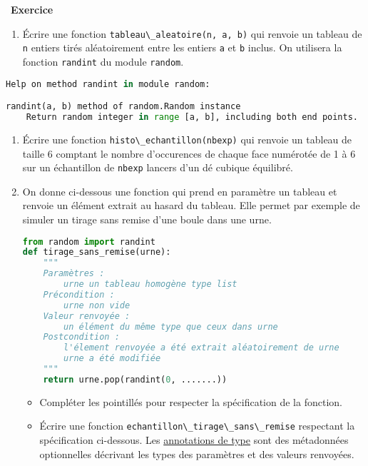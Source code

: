 \documentclass[
  10pt,
]{article}
\newcommand{\passthrough}[1]{#1}
\providecommand{\tightlist}{%
  \setlength{\itemsep}{0pt}\setlength{\parskip}{0pt}}
\newcounter{exo}
\newenvironment{exercice}[1]
{\par \medskip   \addtocounter{exo}{1} \noindent  
\begin{bclogo}[arrondi =0.1,   noborder = true, logo=\bccrayon, marge=4]{~\textbf{Exercice} \textbf{\theexo} {\itshape #1} }  \par}
{
\end{bclogo}
 \par \bigskip }
\newcounter{def}
\newcounter{histo}
\begin{document}
\begin{exercice}{}

\begin{enumerate}
\def\labelenumi{\arabic{enumi}.}
\tightlist
\item
  Écrire une fonction
  \passthrough{\lstinline!tableau\_aleatoire(n, a, b)!} qui renvoie un
  tableau de \passthrough{\lstinline!n!} entiers tirés aléatoirement
  entre les entiers \passthrough{\lstinline!a!} et
  \passthrough{\lstinline!b!} inclus. On utilisera la fonction
  \passthrough{\lstinline!randint!} du module
  \passthrough{\lstinline!random!}.
\end{enumerate}

\begin{lstlisting}[language=Python]
Help on method randint in module random:

randint(a, b) method of random.Random instance
    Return random integer in range [a, b], including both end points.
\end{lstlisting}

\begin{enumerate}
\def\labelenumi{\arabic{enumi}.}
\setcounter{enumi}{1}
\item
  Écrire une fonction
  \passthrough{\lstinline!histo\_echantillon(nbexp)!} qui renvoie un
  tableau de taille 6 comptant le nombre d'occurences de chaque face
  numérotée de 1 à 6 sur un échantillon de
  \passthrough{\lstinline!nbexp!} lancers d'un dé cubique équilibré.
\item
  On donne ci-dessous une fonction qui prend en paramètre un tableau et
  renvoie un élément extrait au hasard du tableau. Elle permet par
  exemple de simuler un tirage sans remise d'une boule dans une urne.

\begin{lstlisting}[language=Python]
from random import randint
def tirage_sans_remise(urne):
    """ 
    Paramètres :
        urne un tableau homogène type list
    Précondition :
        urne non vide
    Valeur renvoyée :
        un élément du même type que ceux dans urne
    Postcondition :
        l'élement renvoyée a été extrait aléatoirement de urne
        urne a été modifiée
    """
    return urne.pop(randint(0, .......))
\end{lstlisting}

  \begin{itemize}
  \tightlist
  \item
    Compléter les pointillés pour respecter la spécification de la
    fonction.
  \item
    Écrire une fonction
    \passthrough{\lstinline!echantillon\_tirage\_sans\_remise!}
    respectant la spécification ci-dessous. Les
    \href{https://docs.python.org/fr/3/tutorial/controlflow.html\#function-annotations}{annotations
    de type} sont des métadonnées optionnelles décrivant les types des
    paramètres et des valeurs renvoyées.
  \end{itemize}


\end{enumerate}
\end{exercice}
\end{document}
